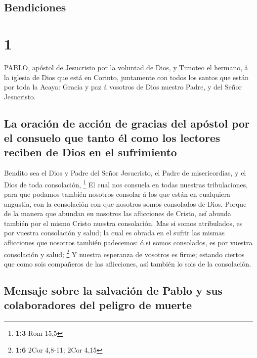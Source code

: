 \hypertarget{bendiciones}{%
\subsection{Bendiciones}\label{bendiciones}}

\hypertarget{section}{%
\section{1}\label{section}}

 PABLO, apóstol de Jesucristo por la voluntad de Dios, y
Timoteo el hermano, á la iglesia de Dios que está en Corinto, juntamente
con todos los santos que están por toda la Acaya:  Gracia y
paz á vosotros de Dios nuestro Padre, y del Señor Jesucristo.

\hypertarget{la-oraciuxf3n-de-acciuxf3n-de-gracias-del-apuxf3stol-por-el-consuelo-que-tanto-uxe9l-como-los-lectores-reciben-de-dios-en-el-sufrimiento}{%
\subsection{La oración de acción de gracias del apóstol por el consuelo
que tanto él como los lectores reciben de Dios en el
sufrimiento}\label{la-oraciuxf3n-de-acciuxf3n-de-gracias-del-apuxf3stol-por-el-consuelo-que-tanto-uxe9l-como-los-lectores-reciben-de-dios-en-el-sufrimiento}}

 Bendito sea el Dios y Padre del Señor Jesucristo, el Padre
de misericordias, y el Dios de toda consolación, \footnote{\textbf{1:3}
  Rom 15,5}  El cual nos consuela en todas nuestras
tribulaciones, para que podamos también nosotros consolar á los que
están en cualquiera angustia, con la consolación con que nosotros somos
consolados de Dios.  Porque de la manera que abundan en
nosotros las aflicciones de Cristo, así abunda también por el mismo
Cristo nuestra consolación.  Mas si somos atribulados, es
por vuestra consolación y salud; la cual es obrada en el sufrir las
mismas aflicciones que nosotros también padecemos: ó si somos
consolados, es por vuestra consolación y salud; \footnote{\textbf{1:6}
  2Cor 4,8-11; 2Cor 4,15}  Y nuestra esperanza de vosotros
es firme; estando ciertos que como sois compañeros de las aflicciones,
así también lo sois de la consolación.

\hypertarget{mensaje-sobre-la-salvaciuxf3n-de-pablo-y-sus-colaboradores-del-peligro-de-muerte}{%
\subsection{Mensaje sobre la salvación de Pablo y sus colaboradores del
peligro de
muerte}\label{mensaje-sobre-la-salvaciuxf3n-de-pablo-y-sus-colaboradores-del-peligro-de-muerte}}

